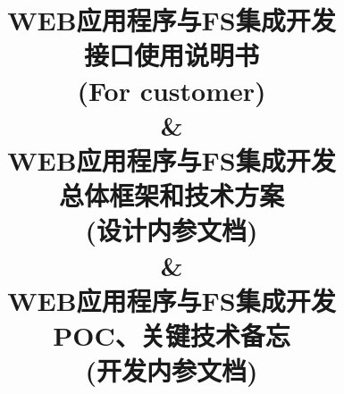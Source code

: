 \documentclass[a4paper]{article}
\newif\ifprivate
\newif\ifdevteam
\begin{document}

\ifprivate
\ifdevteam
  \title{
  \Huge{WEB应用程序与FS集成开发 \\接口使用说明书}\\
  \Large{(For customer)}\vspace{1cm}\\
  \&\vspace{1cm}\\
  \Huge{WEB应用程序与FS集成开发 \\总体框架和技术方案}\\
  \Large{(设计内参文档)}\vspace{1cm}\\
  \&\vspace{1cm}\\
  \Huge{WEB应用程序与FS集成开发 \\POC、关键技术备忘}\\
  \Large{(开发内参文档)}\vspace{4cm}}
\else
\end{document}
